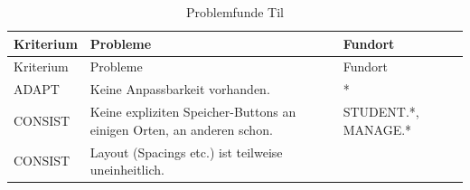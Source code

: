 \documentclass[
  12pt,
  ngerman,
  a4paper,
]{article}
\begin{document}
\begin{longtable}[]{@{}lll@{}}
\caption{Problemfunde Til \label{tbl:heur:til}}\tabularnewline
\toprule
\begin{minipage}[b]{0.14\columnwidth}\raggedright
Kriterium\strut
\end{minipage} & \begin{minipage}[b]{0.55\columnwidth}\raggedright
Probleme\strut
\end{minipage} & \begin{minipage}[b]{0.23\columnwidth}\raggedright
Fundort\strut
\end{minipage}\tabularnewline
\midrule
\endfirsthead
\toprule
\begin{minipage}[b]{0.14\columnwidth}\raggedright
Kriterium\strut
\end{minipage} & \begin{minipage}[b]{0.55\columnwidth}\raggedright
Probleme\strut
\end{minipage} & \begin{minipage}[b]{0.23\columnwidth}\raggedright
Fundort\strut
\end{minipage}\tabularnewline
\midrule
\endhead
\begin{minipage}[t]{0.14\columnwidth}\raggedright
ADAPT\strut
\end{minipage} & \begin{minipage}[t]{0.55\columnwidth}\raggedright
Keine Anpassbarkeit vorhanden.\strut
\end{minipage} & \begin{minipage}[t]{0.23\columnwidth}\raggedright
*\strut
\end{minipage}\tabularnewline
\begin{minipage}[t]{0.14\columnwidth}\raggedright
CONSIST\strut
\end{minipage} & \begin{minipage}[t]{0.55\columnwidth}\raggedright
Keine expliziten Speicher-Buttons an einigen Orten, an anderen
schon.\strut
\end{minipage} & \begin{minipage}[t]{0.23\columnwidth}\raggedright
STUDENT.*, MANAGE.*\strut
\end{minipage}\tabularnewline
\begin{minipage}[t]{0.14\columnwidth}\raggedright
CONSIST\strut
\end{minipage} & \begin{minipage}[t]{0.55\columnwidth}\raggedright
Layout (Spacings etc.) ist teilweise uneinheitlich.\strut
\end{minipage} & \begin{minipage}[t]{0.23\columnwidth}\raggedright

\end{minipage}
\end{longtable}
\end{document}
